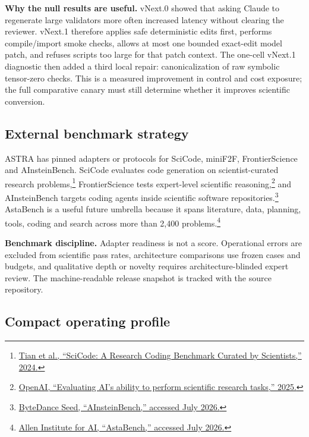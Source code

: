 \documentclass[10pt,a4paper]{article}
\begin{document}
\begin{keybox}
\textbf{Why the null results are useful.} vNext.0 showed that asking Claude to regenerate
large validators more often increased latency without clearing the reviewer. vNext.1
therefore applies safe deterministic edits first, performs compile/import smoke checks,
allows at most one bounded exact-edit model patch, and refuses scripts too large for
that patch context. The one-cell vNext.1 diagnostic then added a third local repair:
canonicalization of raw symbolic tensor-zero checks. This is a measured improvement in
control and cost exposure; the full comparative canary must still determine whether it
improves scientific conversion.
\end{keybox}

\subsection*{External benchmark strategy}

ASTRA has pinned adapters or protocols for SciCode, miniF2F, FrontierScience and
AInsteinBench. SciCode evaluates code generation on scientist-curated research
problems,\footnote{\href{https://arxiv.org/abs/2407.13168}{Tian et al., ``SciCode: A Research Coding Benchmark Curated by Scientists,'' 2024.}}
FrontierScience tests expert-level scientific reasoning,\footnote{\href{https://openai.com/index/frontierscience/}{OpenAI, ``Evaluating AI's ability to perform scientific research tasks,'' 2025.}}
and AInsteinBench targets coding agents inside scientific software
repositories.\footnote{\href{https://github.com/ByteDance-Seed/AInsteinBench}{ByteDance Seed, ``AInsteinBench,'' accessed July 2026.}}
AstaBench is a useful future umbrella because it spans literature, data, planning,
tools, coding and search across more than 2,400 problems.\footnote{\href{https://allenai.org/asta/bench}{Allen Institute for AI, ``AstaBench,'' accessed July 2026.}}

\begin{plainbox}
\textbf{Benchmark discipline.} Adapter readiness is not a score. Operational errors are
excluded from scientific pass rates, architecture comparisons use frozen cases and
budgets, and qualitative depth or novelty requires architecture-blinded expert review.
The machine-readable release snapshot is tracked with the source repository.
\end{plainbox}

\subsection*{Compact operating profile}
\end{document}
